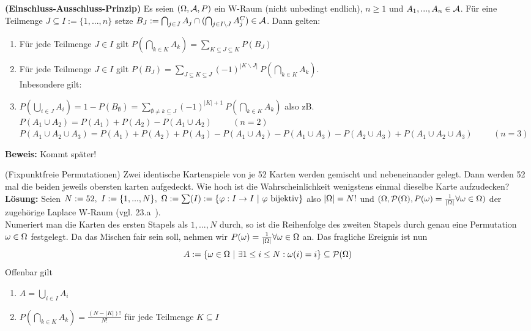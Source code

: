 \documentclass[parskip = full, 12pt]{scrartcl}
\begin{document}
\label{ss: Proposition 3.7}
	\textbf{(Einschluss-Ausschluss-Prinzip)} Es seien $(\Omega, \mathcal{A}, P)$ ein W-Raum
	(nicht unbedingt endlich), $n \geq 1$ und $A_1, ..., A_n \in \mathcal{A}$. Für eine
	Teilmenge $J \subseteq I := \{ 1, ..., n \}$ setze $B_J := \bigcap_
	{j \in J} A_j \cap (\bigcap_{j \in I \backslash J} A_{j}^C) \in 
	\mathcal{A}$. Dann gelten:
	\begin{enumerate}
		\item Für jede Teilmenge $J \in I$ gilt $P(\bigcap_{k \in K} A_k)
		= \sum_{K \subseteq J \subseteq K} P(B_J)$
		\item Für jede Teilmenge $J \in I$ gilt $P(B_J) = \sum_{J 
			\subseteq K \subseteq J} (-1)^{|K \backslash J|}\ P(\bigcap_
			{k \in K} A_k)$.\\
			 Inbesondere gilt:
		\item $P(\bigcup_{i \in J} A_i) = 1 - P(B_\emptyset) = \sum 
			_{\emptyset \neq k \subseteq J} (-1)^{|K| + 1}\ P(\bigcap  
			_{k \in K} A_k)$	also zB. \\
		$P(A_1 \cup A_2) = P(A_1) + P(A_2) - P(A_1 \cup A_2) \hspace{1cm} (n=2)$\\
		$P(A_1 \cup A_2 \cup A_3) = P(A_1) + P(A_2) + P(A_3) - P(A_1 \cup A_2) 
			- P(A_1 \cup A_3) - P(A_2 \cup A_3) + P(A_1 \cup A_2 \cup A_3) 
			\hspace{1cm} (n=3)$\\
	\end{enumerate}
	\textbf{Beweis:} Kommt später!

\label{ss: Beispiel 3.8}
	(Fixpunktfreie Permutationen) Zwei identische Kartenspiele von je 52 Karten 
	werden gemischt und nebeneinander gelegt. Dann werden 52 mal die beiden
	jeweils obersten karten aufgedeckt. Wie hoch ist die Wahrscheinlichkeit
	wenigstens einmal dieselbe Karte aufzudecken?\\
	\textbf{Lösung:} Seien $N := 52,\ I := \{ 1, ..., N \},\ \Omega := \sum(I) := 
	\{ \varphi: I \rightarrow I\ |\ \varphi \textrm{ bijektiv} \}$ also $|\Omega| =   
	N!$ und $ (\Omega, \mathcal{P}(\Omega), P(\omega) = \frac{1}{|\Omega|} \forall \omega \in \Omega)$ der  
	zugehörige Laplace W-Raum (vgl. 23.a~).\\
	Numeriert man die Karten des ersten Stapels als $1, ..., N$ durch, so ist die 
	Reihenfolge des zweiten Stapels durch genau eine Permutation $\omega \in \Omega$
	festgelegt.
	Da das Mischen fair sein soll, nehmen wir $P(\omega) = \frac{1}{|\Omega|} \forall
	\omega \in \Omega$ an. Das fragliche Ereignis ist nun
	$$A := \{ \omega \in \Omega\ |\ \exists 1 \leq i \leq N: \omega(i) = i \} \subseteq
	\mathcal{P}(\Omega)$$
	Offenbar gilt
	\begin{enumerate}
		\item $ A = \bigcup_{i \in I} A_i $ 
		\item $ P(\bigcap_{k \in K} A_k) = \frac{(N-|K|)!}{N!}$ für jede Teilmenge 
			$K \subseteq I$
	\end{enumerate}
\end{document}
